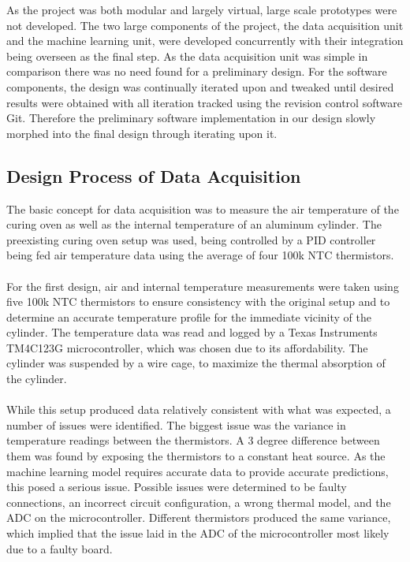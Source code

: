 As the project was both modular and largely virtual, large scale prototypes were not developed. The two large components of the project, the data acquisition unit and the machine learning unit, were developed concurrently with their integration being overseen as the final step. As the data acquisition unit was simple in comparison there was no need found for a preliminary design. For the software components, the design was continually iterated upon and tweaked until desired results were obtained with all iteration tracked using the revision control software Git. Therefore the preliminary software implementation in our design slowly morphed into the final design through iterating upon it. 

\subsection{Design Process of Data Acquisition}
The basic concept for data acquisition was to measure the air temperature of the curing oven as well as the internal temperature of an aluminum cylinder. The preexisting curing oven setup was used, being controlled by a PID controller being fed air temperature data using the average of four 100k NTC thermistors. \\\\
For the first design, air and internal temperature measurements were taken using five 100k NTC thermistors to ensure consistency with the original setup and to determine an accurate temperature profile for the immediate vicinity of the cylinder. The temperature data was read and logged by a Texas Instruments TM4C123G microcontroller, which was chosen due to its affordability. The cylinder was suspended by a wire cage, to maximize the thermal absorption of the cylinder. \\\\
While this setup produced data relatively consistent with what was expected, a number of issues were identified.
The biggest issue was the variance in temperature readings between the thermistors. A 3 degree difference between them was found by exposing the thermistors to a constant heat source. As the machine learning model requires accurate data to provide accurate predictions, this posed a serious issue. Possible issues were determined to be faulty connections, an incorrect circuit configuration, a wrong thermal model, and the ADC on the microcontroller. Different thermistors produced the same variance, which implied that the issue laid in the ADC of the microcontroller most likely due to a faulty board.\\\\
